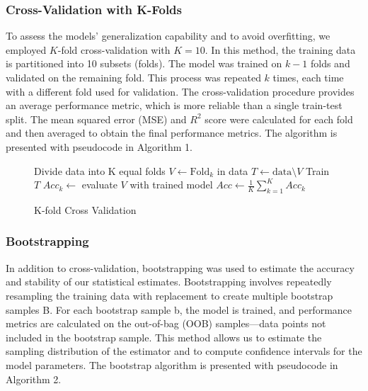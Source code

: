 \subsubsection{Cross-Validation with K-Folds}

To assess the models' generalization capability and to avoid overfitting, we employed $K$-fold cross-validation with $K = 10$. In this method, the training data is partitioned into 10 subsets (folds). The model was trained on $k-1$ folds and validated on the remaining fold. This process was repeated $k$ times, each time with a different fold used for validation. The cross-validation procedure provides an average performance metric, which is more reliable than a single train-test split. The mean squared error (MSE) and $R^2$ score were calculated for each fold and then averaged to obtain the final performance metrics. The algorithm is presented with pseudocode in Algorithm 1.


\begin{figure}[H]
    \begin{algorithm}[H]
    \caption{K-fold Cross Validation \cite{K-foldCrossValidation}}
    \label{algo:kfold}
        \begin{algorithmic}[1]
            \State Divide data into K equal folds 
                \State $V \gets \text{Fold}_{k}$ in data
                \State $T \gets \text{data} \setminus V$
                \State Train $T$
                \State $Acc_k \gets$ evaluate $V$ with trained model
            \EndFor
            \State $Acc \gets \frac{1}{K} \sum_{k=1}^{K} Acc_k$
             \EndProcedure
        \end{algorithmic}
    \end{algorithm}
\end{figure}

\subsubsection{Bootstrapping}

In addition to cross-validation, bootstrapping was used to estimate the accuracy and stability of our statistical estimates. Bootstrapping involves repeatedly resampling the training data with replacement to create multiple bootstrap samples B. For each bootstrap sample b, the model is trained, and performance metrics are calculated on the out-of-bag (OOB) samples—data points not included in the bootstrap sample. This method allows us to estimate the sampling distribution of the estimator and to compute confidence intervals for the model parameters. The bootstrap algorithm is presented with pseudocode in Algorithm 2.

